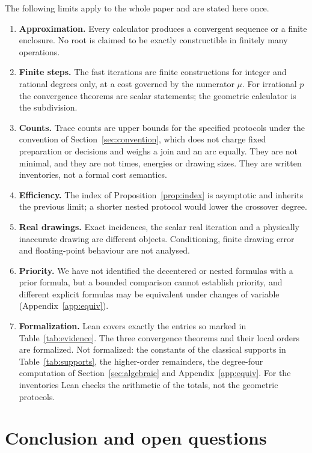 The following limits apply to the whole paper and are stated here once.
\begin{enumerate}[label=\arabic*.]
\item \textbf{Approximation.} Every calculator produces a convergent sequence or a finite enclosure. No
  root is claimed to be exactly constructible in finitely many operations.
\item \textbf{Finite steps.} The fast iterations are finite constructions for integer and rational
  degrees only, at a cost governed by the numerator $\mu$. For irrational $p$ the convergence theorems
  are scalar statements; the geometric calculator is the subdivision.
\item \textbf{Counts.} Trace counts are upper bounds for the specified protocols under the convention of
  Section~\ref{sec:convention}, which does not charge fixed preparation or decisions and weighs a join
  and an arc equally. They are not minimal, and they are not times, energies or drawing sizes. They are
  written inventories, not a formal cost semantics.
\item \textbf{Efficiency.} The index of Proposition~\ref{prop:index} is asymptotic and inherits the
  previous limit; a shorter nested protocol would lower the crossover degree.
\item \textbf{Real drawings.} Exact incidences, the scalar real iteration and a physically inaccurate
  drawing are different objects. Conditioning, finite drawing error and floating-point behaviour are not
  analysed.
\item \textbf{Priority.} We have not identified the decentered or nested formulas with a prior formula,
  but a bounded comparison cannot establish priority, and different explicit formulas may be equivalent under changes of variable
  (Appendix~\ref{app:equiv}).
\item \textbf{Formalization.} Lean covers exactly the entries so marked in Table~\ref{tab:evidence}.
  The three convergence theorems and their local orders are formalized. Not formalized: the constants
  of the classical supports in Table~\ref{tab:supports}, the higher-order remainders, the degree-four
  computation of Section~\ref{sec:algebraic} and Appendix~\ref{app:equiv}. For the inventories Lean checks
  the arithmetic of the totals, not the geometric protocols.
\end{enumerate}

\section{Conclusion and open questions}\label{sec:conclusion}

